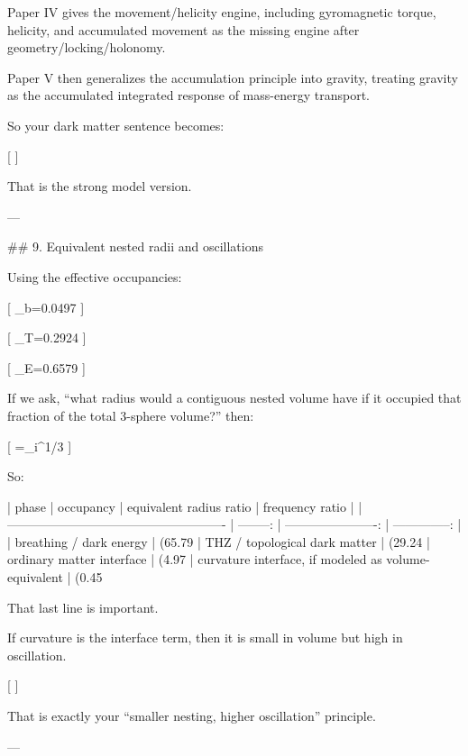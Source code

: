 Paper IV gives the movement/helicity engine, including gyromagnetic torque, helicity, and accumulated movement as the missing engine after geometry/locking/holonomy. 

Paper V then generalizes the accumulation principle into gravity, treating gravity as the accumulated integrated response of mass-energy transport. 

So your dark matter sentence becomes:

[
]

That is the strong model version.

---

## 9. Equivalent nested radii and oscillations

Using the effective occupancies:

[
\phi_b=0.0497
]

[
\phi_T=0.2924
]

[
\phi_E=0.6579
]

If we ask, “what radius would a contiguous nested volume have if it occupied that fraction of the total 3-sphere volume?” then:

[
=\phi_i^{1/3}
]

So:

| phase                                                | occupancy | equivalent radius ratio | frequency ratio |
| ---------------------------------------------------- | --------: | ----------------------: | --------------: |
| breathing / dark energy                              |  (65.79%
| THZ / topological dark matter                        |  (29.24%
| ordinary matter interface                            |   (4.97%
| curvature interface, if modeled as volume-equivalent |   (0.45%

That last line is important.

If curvature is the interface term, then it is small in volume but high in oscillation.

[
]

That is exactly your “smaller nesting, higher oscillation” principle.

---

